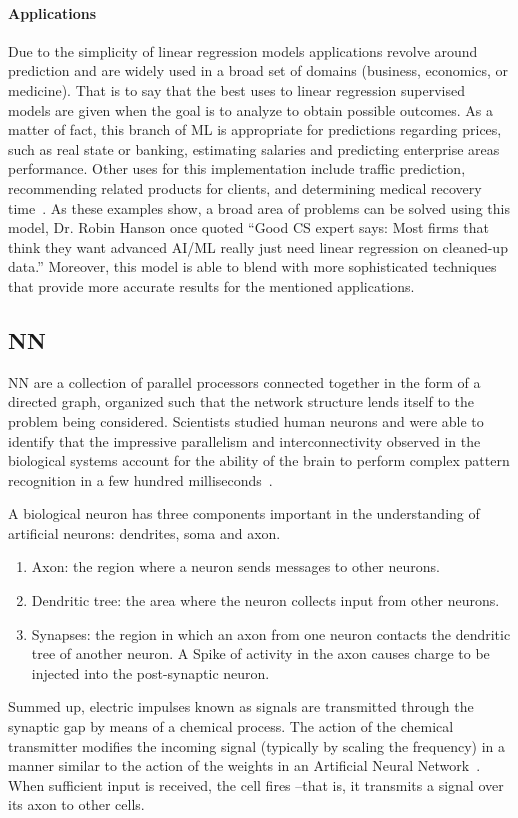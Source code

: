 \paragraph{Applications}

Due to the simplicity of linear regression models applications revolve around prediction and are 
widely used in a broad set of domains (\eg business, economics, or medicine). That is to say that the 
best uses to linear regression supervised models are given when the goal is to analyze to obtain 
possible outcomes. As a matter of fact, this branch of \ac{ML} is appropriate for predictions regarding 
prices, such as real state or banking, estimating salaries and predicting enterprise areas performance. 
Other uses for this implementation include traffic prediction, recommending related products for 
clients, and determining medical recovery time~\cite{grandeur17}. As these examples show, a broad 
area of  problems can be solved using this model, Dr. Robin Hanson once quoted ``Good CS expert 
says: Most firms that think they want advanced AI/ML really just need linear regression on cleaned-up 
data.'' Moreover, this model is able to blend with more sophisticated techniques that provide more 
accurate results for the mentioned applications. 


\subsection{\acl{NN}}

\acl{NN} are a collection of parallel processors connected together in the form of a directed graph, 
organized such that the network structure lends itself to the problem being considered. Scientists 
studied human neurons and were able to identify that the impressive parallelism and interconnectivity 
observed in the biological systems account for the ability of the brain to perform complex pattern 
recognition in a few hundred milliseconds~\cite{freeman91}.

A biological neuron has three components important in the understanding of artificial neurons: 
dendrites, soma and axon. 
\begin{enumerate}
 \item Axon:  the region where a neuron sends messages to other neurons.
 \item Dendritic tree: the area where the neuron collects input from other neurons.
 \item Synapses: the region in which an axon from one neuron contacts the dendritic tree of another 
 neuron. A Spike of activity in the axon causes charge to be injected into the post-synaptic neuron.
\end{enumerate}
Summed up, electric impulses known as signals are transmitted through 
the synaptic gap by means of a chemical process. The action of the chemical transmitter modifies the 
incoming signal (typically by scaling the frequency) in a manner similar to the action of the weights in 
an Artificial Neural Network~\cite{fausett93}. When sufficient input is received, the cell fires --that is, it 
transmits a signal over its axon to other cells. 

